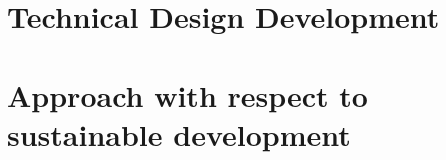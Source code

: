 \documentclass[11pt]{report}
\begin{document}



%
%

\chapter{Technical Design Development}
\label{dse}






%
%

\chapter{Approach with respect to sustainable development}
\label{dseSustainable}



%
%
\end{document}
